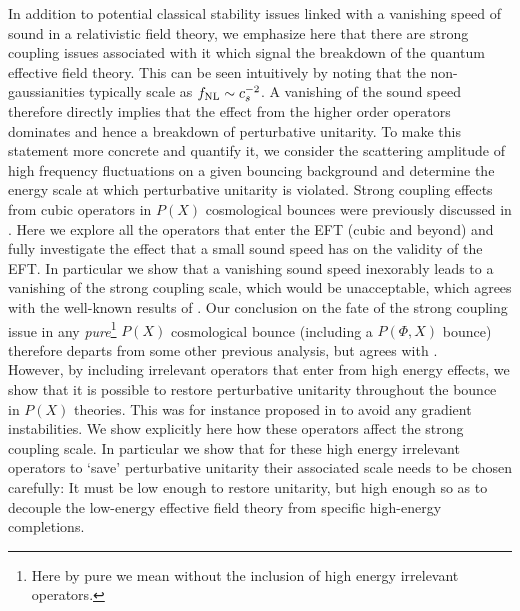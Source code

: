 \documentclass[12pt]{article}
\begin{document}
In addition to potential classical stability issues linked with a vanishing speed of sound in a relativistic field theory, we emphasize here that there are strong coupling issues associated with it which signal the breakdown of the quantum effective field theory. This can be seen intuitively by noting that the non-gaussianities typically scale as $f_{\rm NL}\sim c_s^{-2}$. A vanishing of the sound speed therefore directly implies that the effect from the higher order operators dominates and hence a breakdown of perturbative unitarity.  To make this statement more concrete and quantify it,
we consider the scattering amplitude of high frequency fluctuations on a given bouncing background and determine the energy scale at which perturbative unitarity is violated. Strong coupling effects from cubic operators in $P(X)$ cosmological bounces were previously discussed in  \cite{Koehn:2015vvy}. Here we explore all the operators that enter the EFT (cubic and beyond) and fully investigate the effect that a small sound speed has on the validity of the EFT. In particular we show that a vanishing sound speed inexorably leads to a vanishing of the strong coupling scale, which would be unacceptable, which agrees with the well-known results of \cite{Vikman:2004dc,Easson:2016klq}. Our conclusion on the fate of the strong coupling issue in any {\it pure}\footnote{Here by pure we mean without the inclusion of high energy irrelevant operators.} $P(X)$  cosmological bounce (including a $P(\Phi,X)$ bounce) therefore departs  from  some other previous analysis, but agrees with \cite{Vikman:2004dc,Easson:2016klq}.  \\

However, by including irrelevant operators that enter from high energy effects, we show that it is possible to restore perturbative unitarity throughout the bounce in $P(X)$ theories. This was for instance proposed in \cite{Creminelli:2006xe, Buchbinder:2007ad} to avoid any gradient instabilities. We show explicitly here how these operators affect the strong coupling scale.  In particular we show that for these high energy irrelevant operators to `save' perturbative unitarity their associated scale needs to be chosen carefully: It must be low enough to restore unitarity, but high enough so as to decouple the low-energy effective field theory from specific high-energy completions.\\
\end{document}
